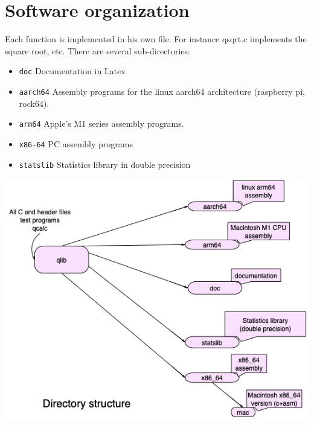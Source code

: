 \documentclass[10pt,a4paper,x11names]{memoir} %
\begin{document}
\section{Software organization}
Each function is implemented in  his own file. For instance qsqrt.c implements the square root, etc. 
There are several sub-directories:
\begin{itemize}
	\item \texttt{doc} Documentation in Latex
	\item \texttt{aarch64} Assembly programs for the linux aarch64 architecture (raspberry pi, rock64).
	\item \texttt{arm64} Apple's M1 series assembly programs.
	\item \texttt{x86-64} PC assembly programs
	\item \texttt{statslib} Statistics library in double precision
\end{itemize}


\includegraphics[scale=0.75]{directories.png}
\end{document}
